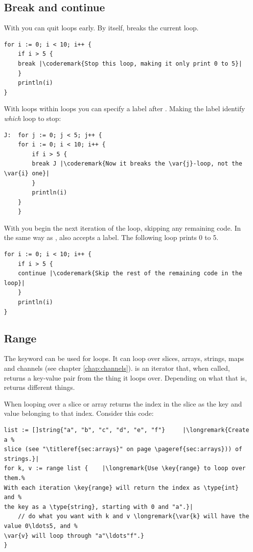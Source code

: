 \subsection{Break and continue}
With  you can quit loops early.  By itself,  breaks
the current loop.
\begin{lstlisting}
for i := 0; i < 10; i++ {
    if i > 5 {
	break |\coderemark{Stop this loop, making it only print 0 to 5}|
    }
    println(i)
}
\end{lstlisting}
With loops within loops you can specify a label after .
Making the label identify \emph{which} loop to stop:
\begin{lstlisting}
J:  for j := 0; j < 5; j++ {
	for i := 0; i < 10; i++ {
	    if i > 5 { 
		break J	|\coderemark{Now it breaks the \var{j}-loop, not the \var{i} one}|
	    }
	    println(i)
	}
    } 
\end{lstlisting}

With  you begin the next iteration of the
loop, skipping any remaining code. In the same way as ,
 also accepts a label. The following loop prints 0 to 5.
\begin{lstlisting}
for i := 0; i < 10; i++ {
    if i > 5 {
	continue |\coderemark{Skip the rest of the remaining code in the loop}|
    }
    println(i)
}
\end{lstlisting}

\subsection{Range}
The keyword  can be used for loops. It
can loop over slices, arrays, strings, maps and channels (see chapter
\ref{chap:channels}).  is
an iterator that, when called, returns a key-value pair from the thing it
loops over. Depending on what that is,  returns
different things.

When looping over a slice or array  returns the index in the
slice as the key and value belonging to that index.
Consider this code: 
\begin{lstlisting}
list := []string{"a", "b", "c", "d", "e", "f"}     |\longremark{Create a %
slice (see "\titleref{sec:arrays}" on page \pageref{sec:arrays})) of strings.}|
for k, v := range list {	|\longremark{Use \key{range} to loop over them.%
With each iteration \key{range} will return the index as \type{int} and %
the key as a \type{string}, starting with 0 and "a".}|
    // do what you want with k and v \longremark{\var{k} will have the value 0\ldots5, and %
\var{v} will loop through "a"\ldots"f".}
}
\end{lstlisting}
\showremarks

